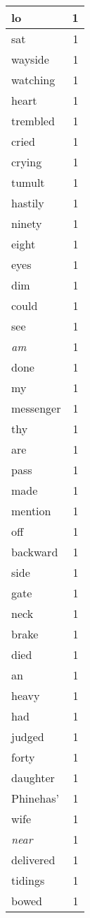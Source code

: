 \begin{center}
\begin{longtable}{l|r}
lo & 1 \\ \hline
sat & 1 \\ \hline
wayside & 1 \\ \hline
watching & 1 \\ \hline
heart & 1 \\ \hline
trembled & 1 \\ \hline
cried & 1 \\ \hline
crying & 1 \\ \hline
tumult & 1 \\ \hline
hastily & 1 \\ \hline
ninety & 1 \\ \hline
eight & 1 \\ \hline
eyes & 1 \\ \hline
dim & 1 \\ \hline
could & 1 \\ \hline
see & 1 \\ \hline
\emph{am} & 1 \\ \hline
done & 1 \\ \hline
my & 1 \\ \hline
messenger & 1 \\ \hline
thy & 1 \\ \hline
are & 1 \\ \hline
pass & 1 \\ \hline
made & 1 \\ \hline
mention & 1 \\ \hline
off & 1 \\ \hline
backward & 1 \\ \hline
side & 1 \\ \hline
gate & 1 \\ \hline
neck & 1 \\ \hline
brake & 1 \\ \hline
died & 1 \\ \hline
an & 1 \\ \hline
heavy & 1 \\ \hline
had & 1 \\ \hline
judged & 1 \\ \hline
forty & 1 \\ \hline
daughter & 1 \\ \hline
Phinehas' & 1 \\ \hline
wife & 1 \\ \hline
\emph{near} & 1 \\ \hline
delivered & 1 \\ \hline
tidings & 1 \\ \hline
bowed & 1 \\ \hline

\end{longtable}
\end{center}
